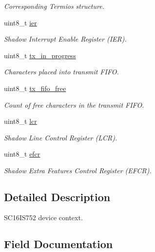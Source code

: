 \begin{DoxyCompactItemize}
\begin{DoxyCompactList}\small\item\em Corresponding Termios structure. \end{DoxyCompactList}\item 
uint8\+\_\+t \mbox{\hyperlink{structsc16is752__context_a4056af13f5dcf980319b4db533de895c}{ier}}
\begin{DoxyCompactList}\small\item\em Shadow Interrupt Enable Register (I\+ER). \end{DoxyCompactList}\item 
uint8\+\_\+t \mbox{\hyperlink{structsc16is752__context_aa16349778a26d57b2795404769b4693b}{tx\+\_\+in\+\_\+progress}}
\begin{DoxyCompactList}\small\item\em Characters placed into transmit F\+I\+FO. \end{DoxyCompactList}\item 
uint8\+\_\+t \mbox{\hyperlink{structsc16is752__context_a8496d94fa7e19cda46888e752550dd75}{tx\+\_\+fifo\+\_\+free}}
\begin{DoxyCompactList}\small\item\em Count of free characters in the transmit F\+I\+FO. \end{DoxyCompactList}\item 
uint8\+\_\+t \mbox{\hyperlink{structsc16is752__context_aed277df58b958f568687f4fc7fd760cc}{lcr}}
\begin{DoxyCompactList}\small\item\em Shadow Line Control Register (L\+CR). \end{DoxyCompactList}\item 
uint8\+\_\+t \mbox{\hyperlink{structsc16is752__context_afb3e139dabfd1d51fdcd17e88b529a21}{efcr}}
\begin{DoxyCompactList}\small\item\em Shadow Extra Features Control Register (E\+F\+CR). \end{DoxyCompactList}\end{DoxyCompactItemize}


\subsection{Detailed Description}
S\+C16\+I\+S752 device context. 

\subsection{Field Documentation}
\mbox{\label{structsc16is752__context_afb3e139dabfd1d51fdcd17e88b529a21}} 
